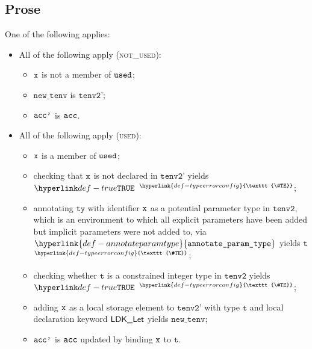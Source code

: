 \documentclass{book}
\newcommand\TypeErrorConfig[0]{\hyperlink{def-typeerrorconfig}{\texttt{\#TE}}}
\newcommand\ProseOrTypeError[0]{\hyperlink{def-proseortypeerror}{$^{\TypeErrorConfig}$}}
\newcommand\annotateparamtype[0]{\hyperlink{def-annotateparamtype}{\texttt{annotate\_param\_type}}}
\newcommand\newtenv[0]{\texttt{new\_tenv}}
\newcommand\tenvtwo[0]{\texttt{tenv2}}
\newcommand\tenvtwop[0]{\texttt{tenv2'}}
\newcommand\vt[0]{\texttt{t}}
\newcommand\tty[0]{\texttt{ty}}
\begin{document}
\subsection{Prose}
One of the following applies:
\begin{itemize}
  \item All of the following apply (\textsc{not\_used}):
  \begin{itemize}
    \item $\texttt{x}$ is not a member of $\texttt{used}$;
    \item $\newtenv$ is $\tenvtwop$;
    \item $\texttt{acc'}$ is $\texttt{acc}$.
  \end{itemize}

  \item All of the following apply (\textsc{used}):
  \begin{itemize}
    \item $\texttt{x}$ is a member of $\texttt{used}$;
    \item checking that $\texttt{x}$ is not declared in $\tenvtwop$ yields $\True$ \ProseOrTypeError;
    \item annotating $\tty$ with identifier $\texttt{x}$ as a potential parameter type in $\tenvtwo$,
          which is an environment to which all explicit parameters have been added but implicit parameters were not added to,
          via $\annotateparamtype$ yields $\vt$ \ProseOrTypeError;
    \item checking whether $\vt$ is a constrained integer type in $\tenvtwo$ yields $\True$ \ProseOrTypeError;
    \item adding $\texttt{x}$ as a local storage element to $\tenvtwop$ with type $\vt$ and local declaration keyword $\textsf{LDK\_Let}$ yields
          $\newtenv$;
    \item $\texttt{acc'}$ is $\texttt{acc}$ updated by binding $\texttt{x}$ to $\vt$.
  \end{itemize}
\end{itemize}
\end{document}
